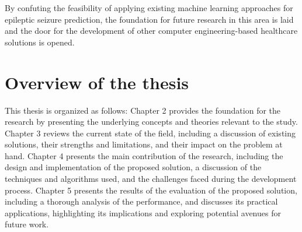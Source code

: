By confuting the feasibility of applying existing machine learning approaches for epileptic seizure prediction, the foundation for future research in this area is laid and the door for the development of other computer engineering-based healthcare solutions is opened.

\section{Overview of the thesis}

This thesis is organized as follows: Chapter 2 provides the foundation for the research by presenting the underlying concepts and theories relevant to the study. Chapter 3 reviews the current state of the field, including a discussion of existing solutions, their strengths and limitations, and their impact on the problem at hand. Chapter 4 presents the main contribution of the research, including the design and implementation of the proposed solution, a discussion of the techniques and algorithms used, and the challenges faced during the development process. Chapter 5 presents the results of the evaluation of the proposed solution, including a thorough analysis of the performance, and discusses its practical applications, highlighting its implications and exploring potential avenues for future work.